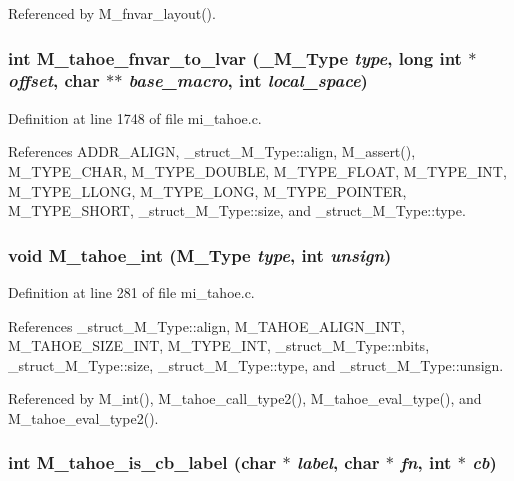 Referenced by M\_\-fnvar\_\-layout().
\subsubsection{\setlength{\rightskip}{0pt plus 5cm}int M\_\-tahoe\_\-fnvar\_\-to\_\-lvar (\bf{\_\-M\_\-Type} {\em type}, long int $\ast$ {\em offset}, char $\ast$$\ast$ {\em base\_\-macro}, int {\em local\_\-space})}\label{mi__tahoe_8c_674bc7806a976981d30794d202023162}




Definition at line 1748 of file mi\_\-tahoe.c.

References ADDR\_\-ALIGN, \_\-struct\_\-M\_\-Type::align, M\_\-assert(), M\_\-TYPE\_\-CHAR, M\_\-TYPE\_\-DOUBLE, M\_\-TYPE\_\-FLOAT, M\_\-TYPE\_\-INT, M\_\-TYPE\_\-LLONG, M\_\-TYPE\_\-LONG, M\_\-TYPE\_\-POINTER, M\_\-TYPE\_\-SHORT, \_\-struct\_\-M\_\-Type::size, and \_\-struct\_\-M\_\-Type::type.
\subsubsection{\setlength{\rightskip}{0pt plus 5cm}void M\_\-tahoe\_\-int (\bf{M\_\-Type} {\em type}, int {\em unsign})}\label{mi__tahoe_8c_7dd8e5b7aba56b59a277b8fee6d6089c}




Definition at line 281 of file mi\_\-tahoe.c.

References \_\-struct\_\-M\_\-Type::align, M\_\-TAHOE\_\-ALIGN\_\-INT, M\_\-TAHOE\_\-SIZE\_\-INT, M\_\-TYPE\_\-INT, \_\-struct\_\-M\_\-Type::nbits, \_\-struct\_\-M\_\-Type::size, \_\-struct\_\-M\_\-Type::type, and \_\-struct\_\-M\_\-Type::unsign.

Referenced by M\_\-int(), M\_\-tahoe\_\-call\_\-type2(), M\_\-tahoe\_\-eval\_\-type(), and M\_\-tahoe\_\-eval\_\-type2().
\subsubsection{\setlength{\rightskip}{0pt plus 5cm}int M\_\-tahoe\_\-is\_\-cb\_\-label (char $\ast$ {\em label}, char $\ast$ {\em fn}, int $\ast$ {\em cb})}\label{mi__tahoe_8c_65db155eb6457075e24b5580b6bb6ba7}




